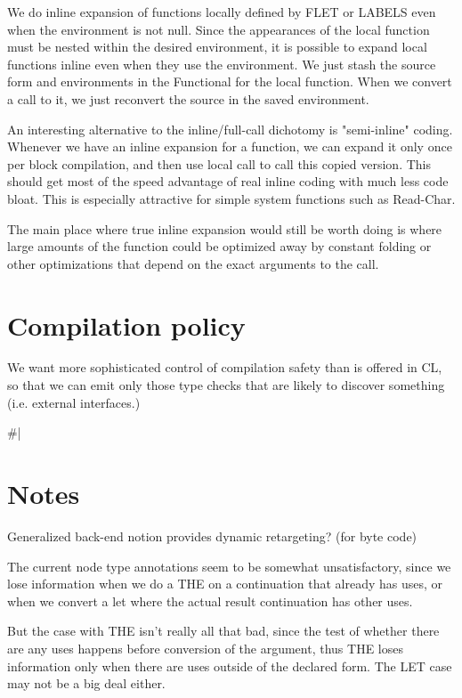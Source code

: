 We do inline expansion of functions locally defined by FLET or LABELS even when
the environment is not null.  Since the appearances of the local function must
be nested within the desired environment, it is possible to expand local
functions inline even when they use the environment.  We just stash the source
form and environments in the Functional for the local function.  When we
convert a call to it, we just reconvert the source in the saved environment.

An interesting alternative to the inline/full-call dichotomy is "semi-inline"
coding.  Whenever we have an inline expansion for a function, we can expand it
only once per block compilation, and then use local call to call this copied
version.  This should get most of the speed advantage of real inline coding
with much less code bloat.  This is especially attractive for simple system
functions such as Read-Char.

The main place where true inline expansion would still be worth doing is where
large amounts of the function could be optimized away by constant folding or
other optimizations that depend on the exact arguments to the call.



\section{Compilation policy}

We want more sophisticated control of compilation safety than is offered in CL,
so that we can emit only those type checks that are likely to discover
something (i.e. external interfaces.)

\#|


\section{Notes}

Generalized back-end notion provides dynamic retargeting?  (for byte code)

The current node type annotations seem to be somewhat unsatisfactory, since we
lose information when we do a THE on a continuation that already has uses, or
when we convert a let where the actual result continuation has other uses.  

But the case with THE isn't really all that bad, since the test of whether
there are any uses happens before conversion of the argument, thus THE loses
information only when there are uses outside of the declared form.  The LET
case may not be a big deal either.

